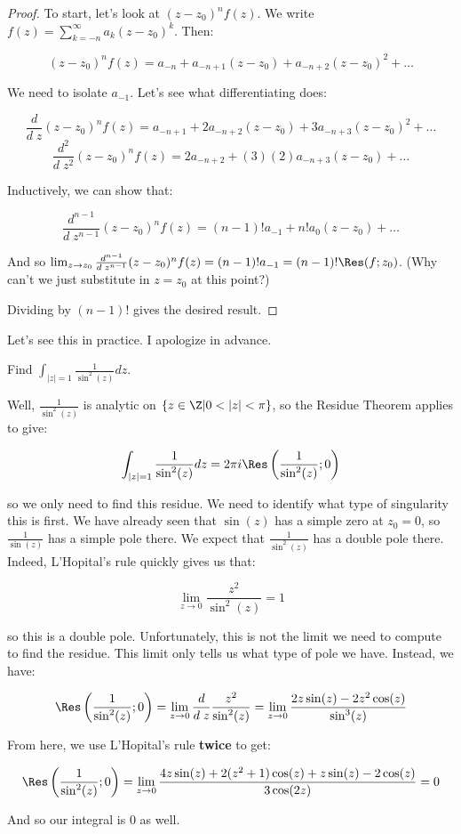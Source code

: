 \begin{proof} To start, let's look at $(z-z_0)^nf(z)$. We write $f(z) = \sum_{k = -n}^\infty a_k(z-z_0)^k$. Then:

$$(z-z_0)^nf(z) = a_{-n} + a_{-n+1}(z-z_0) + a_{-n+2}(z-z_0)^2+\dots$$

We need to isolate $a_{-1}$. Let's see what differentiating does:

$$\frac{d}{d\;z} (z-z_0)^nf(z) = a_{-n+1} + 2a_{-n+2}(z-z_0) + 3a_{-n+3}(z-z_0)^2 + \dots$$
$$\frac{d^2}{d\;z^2} (z-z_0)^nf(z) = 2a_{-n+2} + (3)(2)a_{-n+3}(z-z_0) + \dots$$

Inductively, we can show that:

$$\frac{d^{n-1}}{d\;z^{n-1}} (z-z_0)^nf(z) = (n-1)! a_{-1} + n!a_{0}(z-z_0) + \dots$$

And so $\lim_{z\rightarrow z_0} \frac{d^{n-1}}{d\;z^{n-1}} (z-z_0)^nf(z) = (n-1)!a_{-1} = (n-1)!\Res(f;z_0)$. (Why can't we just substitute in $z = z_0$ at this point?)

Dividing by $(n-1)!$ gives the desired result.

\end{proof}

Let's see this in practice. I apologize in advance.

\begin{ex}{}{} Find $\int_{|z| = 1} \frac{1}{\sin^2(z)}dz$.

Well, $\frac{1}{\sin^2(z)}$ is analytic on $\{z\in\Z|0<|z|< \pi\}$, so the Residue Theorem applies to give:

$$\int_{|z| = 1} \frac{1}{\sin^2(z)}dz = 2\pi i \Res\left(\frac{1}{\sin^2(z)};0\right)$$

\noin so we only need to find this residue. We need to identify what type of singularity this is first. We have already seen that $\sin(z)$ has a simple zero at $z_0 = 0$, so $\frac{1}{\sin(z)}$ has a simple pole there. We expect that $\frac{1}{\sin^2(z)}$ has a double pole there. Indeed, L'Hopital's rule quickly gives us that:

$$\lim_{z\rightarrow 0} \frac{z^2}{\sin^2(z)} = 1$$

\noin so this is a double pole. Unfortunately, this is not the limit we need to compute to find the residue. This limit only tells us what type of pole we have. Instead, we have:

$$\Res\left(\frac{1}{\sin^2(z)};0\right) = \lim_{z\rightarrow 0} \frac{d}{d\;z} \frac{z^2}{\sin^2(z)} = \lim_{z\rightarrow 0} \frac{2z\sin(z) - 2z^2\cos(z)}{\sin^3(z)}$$

From here, we use L'Hopital's rule {\bf twice} to get:

$$\Res\left(\frac{1}{\sin^2(z)};0\right) = \lim_{z\rightarrow 0} \frac{4z\sin(z) + 2(z^2  +1)\cos(z) + z\sin(z) - 2\cos(z)}{3\cos(2z)} = 0$$

And so our integral is $0$ as well.

\end{ex}

